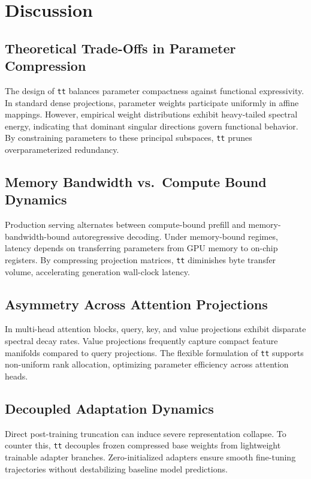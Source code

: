 \section{Discussion}

\subsection{Theoretical Trade-Offs in Parameter Compression}
The design of \texttt{tt} balances parameter compactness against functional expressivity. In standard dense projections, parameter weights participate uniformly in affine mappings. However, empirical weight distributions exhibit heavy-tailed spectral energy, indicating that dominant singular directions govern functional behavior. By constraining parameters to these principal subspaces, \texttt{tt} prunes overparameterized redundancy.

\subsection{Memory Bandwidth vs.\ Compute Bound Dynamics}
Production serving alternates between compute-bound prefill and memory-bandwidth-bound autoregressive decoding. Under memory-bound regimes, latency depends on transferring parameters from GPU memory to on-chip registers. By compressing projection matrices, \texttt{tt} diminishes byte transfer volume, accelerating generation wall-clock latency.

\subsection{Asymmetry Across Attention Projections}
In multi-head attention blocks, query, key, and value projections exhibit disparate spectral decay rates. Value projections frequently capture compact feature manifolds compared to query projections. The flexible formulation of \texttt{tt} supports non-uniform rank allocation, optimizing parameter efficiency across attention heads.

\subsection{Decoupled Adaptation Dynamics}
Direct post-training truncation can induce severe representation collapse. To counter this, \texttt{tt} decouples frozen compressed base weights from lightweight trainable adapter branches. Zero-initialized adapters ensure smooth fine-tuning trajectories without destabilizing baseline model predictions.

